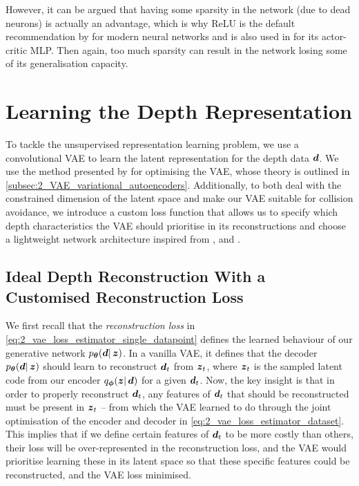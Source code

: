 However, it can be argued that having some sparsity in the network (due to dead neurons) is actually an advantage, which is why ReLU is the default recommendation by \cite{DeepLearningBook} for modern neural networks and is also used in \cite{AMPMotionPriors} for its actor-critic MLP. Then again, too much sparsity can result in the network losing some of its generalisation capacity.

\section{Learning the Depth Representation}
\label{sec:5_learning_representation}
To tackle the unsupervised representation learning problem, we use a convolutional VAE to learn the latent representation for the depth data ${\boldsymbol{d}}$. We use the method presented by \cite{variational_bayes} for optimising the VAE, whose theory is outlined in \cref{subsec:2_VAE_variational_autoencoders}. Additionally, to both deal with the constrained dimension of the latent space and make our VAE suitable for collision avoidance, we introduce a custom loss function that allows us to specify which depth characteristics the VAE should prioritise in its reconstructions and choose a lightweight network architecture inspired from \cite{deepCollisionPredictorOracle}, and \cite{vae_decoder_architecture}.

\subsection{Ideal Depth Reconstruction With a Customised Reconstruction Loss}
\label{subsec:5_vae_reconstruction}
We first recall that the \textit{reconstruction loss} in \eqref{eq:2_vae_loss_estimator_single_datapoint} defines the learned behaviour of our generative network $p_{\boldsymbol{\theta}}({\boldsymbol{d}} |\, \boldsymbol{z})$. In a vanilla VAE, it defines that the decoder $p_{\boldsymbol{\theta}}({\boldsymbol{d}} |\, \boldsymbol{z})$ should learn to reconstruct ${\boldsymbol{d}}_t$ from ${\boldsymbol{z}}_t$, where ${\boldsymbol{z}}_t$ is the sampled latent code from our encoder $q_{\boldsymbol{\phi}}(\boldsymbol{z} |\, {\boldsymbol{d}})$ for a given ${\boldsymbol{d}}_t$. Now, the key insight is that in order to properly reconstruct ${\boldsymbol{d}}_t$, any features of ${\boldsymbol{d}}_t$ that should be reconstructed must be present in ${\boldsymbol{z}}_t$ -- from which the VAE learned to do through the joint optimisation of the encoder and decoder in \eqref{eq:2_vae_loss_estimator_dataset}.
This implies that if we define certain features of ${\boldsymbol{d}}_t$ to be more costly than others, their loss will be over-represented in the reconstruction loss, and the VAE would prioritise learning these in its latent space so that these specific features could be reconstructed, and the VAE loss minimised. 

